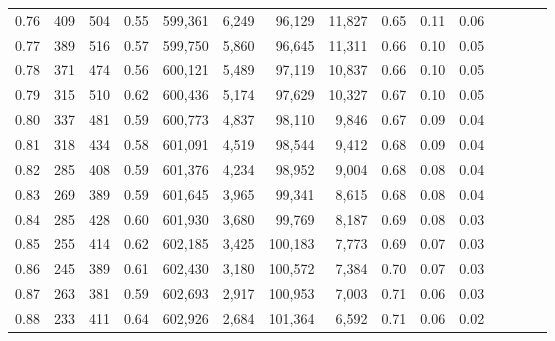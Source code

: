 \begin{tabular}{rrrcrrrrrrrrrrr}
0.76 &     409 &    504 &                                       0.55 &  599,361 &    6,249 &   96,129 &   11,827 &  0.65 &  0.11 &                         0.06 \\
0.77 &     389 &    516 &                                       0.57 &  599,750 &    5,860 &   96,645 &   11,311 &  0.66 &  0.10 &                         0.05 \\
0.78 &     371 &    474 &                                       0.56 &  600,121 &    5,489 &   97,119 &   10,837 &  0.66 &  0.10 &                         0.05 \\
0.79 &     315 &    510 &                                       0.62 &  600,436 &    5,174 &   97,629 &   10,327 &  0.67 &  0.10 &                         0.05 \\
0.80 &     337 &    481 &                                       0.59 &  600,773 &    4,837 &   98,110 &    9,846 &  0.67 &  0.09 &                         0.04 \\
0.81 &     318 &    434 &                                       0.58 &  601,091 &    4,519 &   98,544 &    9,412 &  0.68 &  0.09 &                         0.04 \\
0.82 &     285 &    408 &                                       0.59 &  601,376 &    4,234 &   98,952 &    9,004 &  0.68 &  0.08 &                         0.04 \\
0.83 &     269 &    389 &                                       0.59 &  601,645 &    3,965 &   99,341 &    8,615 &  0.68 &  0.08 &                         0.04 \\
0.84 &     285 &    428 &                                       0.60 &  601,930 &    3,680 &   99,769 &    8,187 &  0.69 &  0.08 &                         0.03 \\
0.85 &     255 &    414 &                                       0.62 &  602,185 &    3,425 &  100,183 &    7,773 &  0.69 &  0.07 &                         0.03 \\
0.86 &     245 &    389 &                                       0.61 &  602,430 &    3,180 &  100,572 &    7,384 &  0.70 &  0.07 &                         0.03 \\
0.87 &     263 &    381 &                                       0.59 &  602,693 &    2,917 &  100,953 &    7,003 &  0.71 &  0.06 &                         0.03 \\
0.88 &     233 &    411 &                                       0.64 &  602,926 &    2,684 &  101,364 &    6,592 &  0.71 &  0.06 &                         0.02 \\

\end{tabular}
